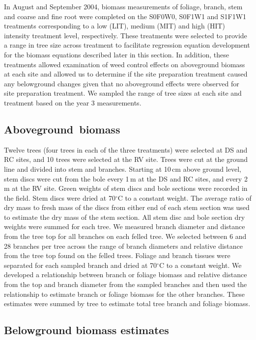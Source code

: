 \documentclass[final]{foresj}
\begin{document}
In August and September 2004, biomass measurements of foliage, branch, stem
and coarse and fine root were completed on the S0F0W0, S0F1W1 and S1F1W1
treatments corresponding to a low (LIT), medium (MIT) and high (HIT)
intensity treatment level, respectively. These treatments were selected to
provide a range in tree size across treatment to facilitate regression
equation development for the biomass equations described later in this
section. In addition, these treatments allowed examination of weed control
effects on aboveground biomass at each site and allowed us to determine if
the site preparation treatment caused any belowground changes given that no
aboveground effects were observed for site preparation treatment. We sampled
the range of tree sizes at each site and treatment based on the year 3
measurements.

\subsection{Aboveground~biomass}

Twelve trees (four trees in each of the three treatments)
were selected at DS and RC sites, and 10 trees were
selected at the RV site. Trees were cut at the ground line
and divided into stem and branches. Starting at 10\,cm
above ground level, stem discs were cut from the bole every
1\,m at the DS and RC sites, and every 2\,m at the RV site.
Green weights of stem discs and bole sections were recorded
in the field. Stem discs were dried at 70$^{\circ}$C to a
constant weight. The average ratio of dry mass to fresh
mass of the discs from either end of each stem section was
used to estimate the dry mass of the stem section. All stem
disc and bole section dry weights were summed for each
tree. We measured branch \nobreak diameter and distance from the
tree top for all branches on each felled tree. We selected
between 6 and 28 branches per tree across the range of
branch diameters and relative distance from the tree top
found on the felled trees. Foliage and branch tissues were
separated for each sampled branch and dried at
70$^{\circ}$C to a constant weight. We developed a
relationship between branch or foliage biomass and relative
distance from the top and branch diameter from the sampled
branches and then used the relationship to estimate branch
or foliage biomass for the other branches. These estimates
were summed by tree to estimate total tree branch and
foliage biomass.

\subsection{Belowground biomass estimates}
\end{document}
